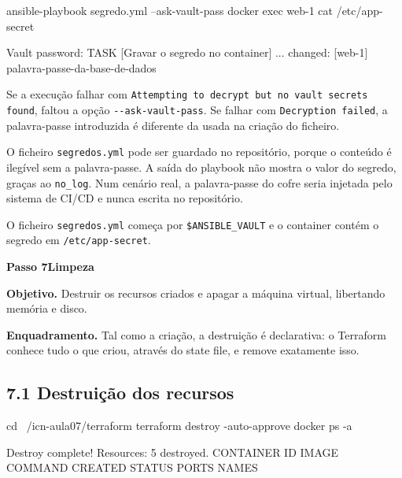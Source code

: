 \documentclass[11pt,a4paper]{article}
\newcommand{\passo}[2]{%
  \clearpage
  \begin{tcolorbox}[colback=SageMuted, colframe=SageMuted, coltext=white,
    boxrule=0pt, arc=4pt, left=14pt, right=14pt, top=10pt, bottom=10pt,
    before skip=0pt, after skip=0.6cm]
  {\Large\bfseries Passo #1}\hfill{\large\bfseries #2}
  \end{tcolorbox}
}
\newcommand{\cmd}[1]{\texttt{#1}}
\begin{document}
\begin{terminal}
ansible-playbook segredo.yml --ask-vault-pass
docker exec web-1 cat /etc/app-secret
\end{terminal}

\begin{saida}
Vault password:
TASK [Gravar o segredo no container] ... changed: [web-1]
palavra-passe-da-base-de-dados
\end{saida}

\begin{erro}
Se a execução falhar com \cmd{Attempting to decrypt but no vault secrets found}, faltou a opção \cmd{-{}-ask-vault-pass}. Se falhar com \cmd{Decryption failed}, a palavra-passe introduzida é diferente da usada na criação do ficheiro.
\end{erro}

\begin{observe}
O ficheiro \cmd{segredos.yml} pode ser guardado no repositório, porque o conteúdo é ilegível sem a palavra-passe. A saída do playbook não mostra o valor do segredo, graças ao \cmd{no\_log}. Num cenário real, a palavra-passe do cofre seria injetada pelo sistema de CI/CD e nunca escrita no repositório.
\end{observe}

\begin{feito}
O ficheiro \cmd{segredos.yml} começa por \cmd{\$ANSIBLE\_VAULT} e o container contém o segredo em \cmd{/etc/app-secret}.
\end{feito}

\passo{7}{Limpeza}

\textbf{Objetivo.} Destruir os recursos criados e apagar a máquina virtual, libertando memória e disco.

\textbf{Enquadramento.} Tal como a criação, a destruição é declarativa: o Terraform conhece tudo o que criou, através do state file, e remove exatamente isso.

\subsection*{7.1 Destruição dos recursos}

\begin{terminal}
cd ~/icn-aula07/terraform
terraform destroy -auto-approve
docker ps -a
\end{terminal}

\begin{saida}
Destroy complete! Resources: 5 destroyed.
CONTAINER ID   IMAGE   COMMAND   CREATED   STATUS   PORTS   NAMES
\end{saida}
\end{document}
